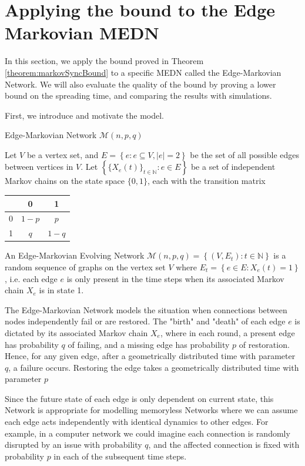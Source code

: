 \section{Applying the bound to the Edge Markovian MEDN}\label{section:floodingBoundEdgeMarkovian}

In this section, we apply the bound proved in Theorem \ref{theorem:markovSyncBound} to a specific MEDN called the Edge-Markovian Network. We will also evaluate the quality of the bound by proving a lower bound on the spreading time, and comparing the results with simulations. 

First, we introduce and motivate the model.
\begin{definition}
	Edge-Markovian Network $\mathcal{M}(n, p, q)$

	\noindent
	Let $V$ be a vertex set, and $E = \left\{e : e \subseteq V, |e| = 2 \right\}$ be the set of all possible edges between vertices in $V$. 
	Let $\left\{\{X_e(t)\}_{t \in \mathbb{N}} : e \in E \right\}$ be a set of independent Markov chains on the state space $\{0,1\}$, each with the transition matrix
	\begin{center}
		\begin{tabular}{ c | c c }
		   & 0     & 1 \\ 
		\hline
		 0 & $1 - p$ & $p$ \\  
		 1 & $q$     & $1 - q$  
		\end{tabular}
	\end{center}
	An Edge-Markovian Evolving Network $\mathcal{M}(n, p, q) = \left\{(V, E_t) : t \in \mathbb{N} \right\}$ is a random sequence of graphs on the vertex set $V$ where $E_t = \left\{ e \in E : X_e(t) = 1 \right\}$, i.e. each edge $e$ is only present in the time steps when its associated Markov chain $X_e$ is in state 1.
\end{definition}
The Edge-Markovian Network models the situation when connections between nodes independently fail or are restored. The "birth" and "death" of each edge $e$ is dictated by its associated Markov chain $X_e$, where in each round, a present edge has probability $q$ of failing, and a missing edge has probability $p$ of restoration. Hence, for any given edge, after a geometrically distributed time with parameter $q$, a failure occurs. Restoring the edge takes a geometrically distributed time with parameter $p$ %

Since the future state of each edge is only dependent on current state, this Network is appropriate for modelling memoryless Networks where we can assume each edge acts independently with identical dynamics to other edges. For example, in a computer network we could imagine each  connection is randomly disrupted by an issue with probability $q$, and the affected connection is fixed with probability $p$ in each of the subsequent time steps. 

